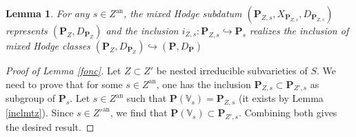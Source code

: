 \documentclass[10pt]{article}
\numberwithin{equation}{subsection}
\theoremstyle{plain}
\newtheorem{lemma}[theorem]{Lemma}
\newtheorem{corollary}[theorem]{Corollary}
\theoremstyle{definition}
\theoremstyle{remark}
\newcommand{\V}{\mathbb V}
\newcommand{\pp}{\mathbf P}
\newcommand{\an}{\mathrm{an}}
\newcommand{\gl}{\mathbf{GL}}
\begin{document}
\begin{lemma}
For any $s \in Z^\an$, the mixed Hodge subdatum  $(\pp_{Z,s}, X_{\pp_{Z,s}}, D_{\pp_{Z,s}})$ represents $(\pp_Z, D_{\pp_Z})$ and the inclusion $i_{Z,s} : \pp_{Z,s} \hookrightarrow \pp_s$ realizes the inclusion of mixed Hodge classes $(\pp_Z, D_{\pp_Z}) \hookrightarrow (\pp, D_\pp)$
\end{lemma}
\begin{proof}[Proof of Lemma \ref{fonc}]
Let $Z \subset Z'$ be nested irreducible subvarieties of $S$. We need to prove that for some $s \in Z^\an$, one has the inclusion $\pp_{Z,s} \subset \pp_{Z',s}$ as subgroup of $\pp_s$. Let $s \in Z^\an$ such that $\pp(\V_s) = \pp_{Z,s}$ (it exists by Lemma \ref{inclmtz}). Since $s \in Z'^\an$, we find that $\pp(\V_s) \subset \pp_{Z',s}$. Combining both gives the desired result.
\end{proof}
\end{document}
